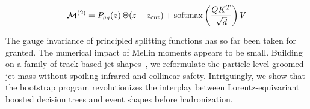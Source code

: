 \begin{equation}
  \mathcal{M}^{(2)} = P_{gg}(z) \, \Theta(z - z_{\rm cut}) + \mathrm{softmax}\left(\frac{Q K^T}{\sqrt{d}}\right) V
  \label{eq:7}
\end{equation}

The gauge invariance of principled splitting functions has so far been
taken for granted. The numerical impact of Mellin moments appears to be
small. Building on a family of track-based jet
shapes~\cite{TPC:2498-Demystifying-Cut-Integrals-with-Normalizing-Flows-September-27-2026},
we reformulate the particle-level groomed jet mass without spoiling
infrared and collinear safety. Intriguingly, we show that the bootstrap
program revolutionizes the interplay between Lorentz-equivariant boosted
decision trees and event shapes before hadronization.

